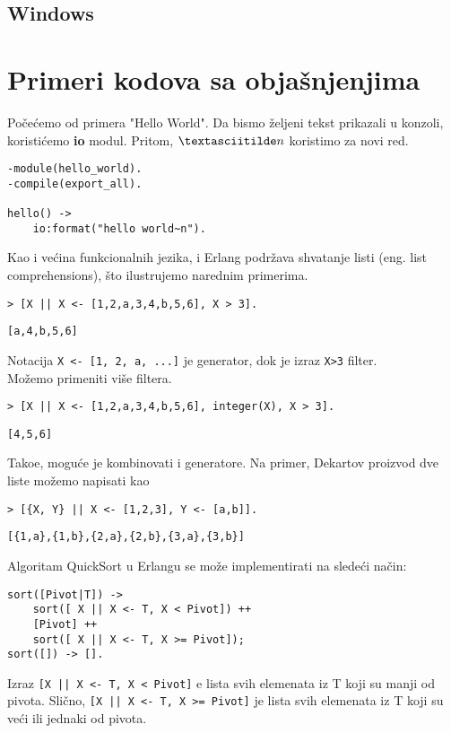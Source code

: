 \documentclass[a4paper]{article}
\begin{document}
{\subsection{Windows}
\label{subsec:instalacijaWindows}


\section{Primeri kodova sa objašnjenjima}
\label{sec:primeri}
Po\v ce\' cemo od primera "Hello World". Da bismo \v zeljeni tekst prikazali u konzoli, koristi\' cemo \textbf{io} modul. Pritom, 
$\textasciitilde n$ koristimo za novi red.
\begin{verbatim}
-module(hello_world).
-compile(export_all).

hello() ->
    io:format("hello world~n").
\end{verbatim}

Kao i ve\' cina funkcionalnih jezika, i Erlang podr\v zava shvatanje listi (eng. list comprehensions), \v sto ilustrujemo narednim primerima.
\begin{verbatim}
> [X || X <- [1,2,a,3,4,b,5,6], X > 3].
\end{verbatim}
\begin{verbatim}
[a,4,b,5,6]
\end{verbatim}
Notacija {\texttt{X <- [1, 2, a, ...]}} je generator, dok je izraz {\texttt{X>3}} filter.\\

Mo\v zemo primeniti vi\v se filtera.
\begin{verbatim}
> [X || X <- [1,2,a,3,4,b,5,6], integer(X), X > 3].
\end{verbatim}
\begin{verbatim}
[4,5,6]
\end{verbatim}

Tako\dj e, mogu\' ce je kombinovati i generatore. Na primer, Dekartov proizvod dve liste mo\v zemo napisati kao
\begin{verbatim}
> [{X, Y} || X <- [1,2,3], Y <- [a,b]].
\end{verbatim}
\begin{verbatim}
[{1,a},{1,b},{2,a},{2,b},{3,a},{3,b}]
\end{verbatim}

Algoritam QuickSort u Erlangu se mo\v ze implementirati na slede\' ci na\v cin:
\begin{verbatim}
sort([Pivot|T]) ->
    sort([ X || X <- T, X < Pivot]) ++
    [Pivot] ++
    sort([ X || X <- T, X >= Pivot]);
sort([]) -> [].
\end{verbatim}
Izraz {\texttt{[X || X <- T, X < Pivot]}} e lista svih elemenata iz T koji su manji od pivota. Sli\v cno, {\texttt{[X || X <- T, X >= Pivot]}} je lista svih elemenata iz T koji su ve\' ci ili jednaki od pivota.\\

}
\end{document}
